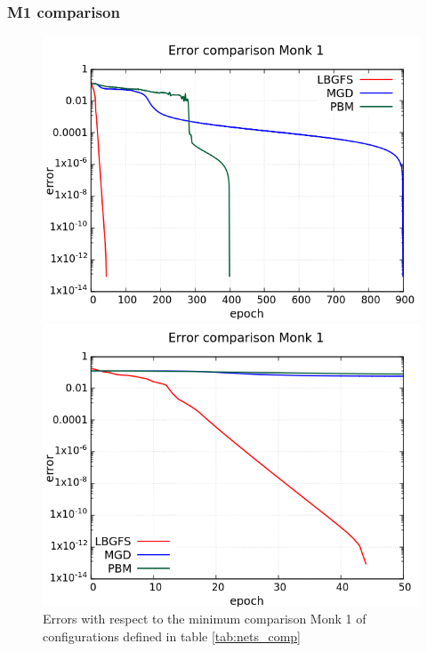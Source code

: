 \subsubsection{M1 comparison}

\begin{figure}[H]
	\centering
	\begin{minipage}[t]{0.5\linewidth}
		\includegraphics[width=\linewidth]{data/Comparison/Monk1/Monk1_R_Comparison_log_standard.png}
	\end{minipage}%
	\begin{minipage}[t]{0.5\linewidth}
		\includegraphics[width=\linewidth]{data/Comparison/Monk1/Monk1_R_Comparison_log_zoom.png}
	\end{minipage}
	\caption{Errors with respect to the minimum comparison Monk 1 of configurations defined in table \ref{tab:nets_comp}}
	\label{R-Monk1}
\end{figure}


